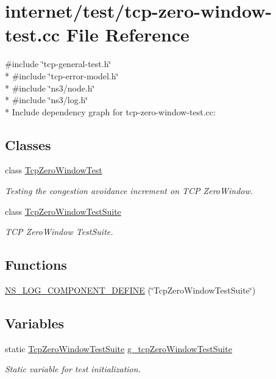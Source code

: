\hypertarget{tcp-zero-window-test_8cc}{}\section{internet/test/tcp-\/zero-\/window-\/test.cc File Reference}
\label{tcp-zero-window-test_8cc}
{\ttfamily \#include \char`\"{}tcp-\/general-\/test.\+h\char`\"{}}\\*
{\ttfamily \#include \char`\"{}tcp-\/error-\/model.\+h\char`\"{}}\\*
{\ttfamily \#include \char`\"{}ns3/node.\+h\char`\"{}}\\*
{\ttfamily \#include \char`\"{}ns3/log.\+h\char`\"{}}\\*
Include dependency graph for tcp-\/zero-\/window-\/test.cc\+:
\subsection*{Classes}
\begin{DoxyCompactItemize}
\item 
class \hyperlink{classTcpZeroWindowTest}{Tcp\+Zero\+Window\+Test}
\begin{DoxyCompactList}\small\item\em Testing the congestion avoidance increment on T\+CP Zero\+Window. \end{DoxyCompactList}\item 
class \hyperlink{classTcpZeroWindowTestSuite}{Tcp\+Zero\+Window\+Test\+Suite}
\begin{DoxyCompactList}\small\item\em T\+CP Zero\+Window Test\+Suite. \end{DoxyCompactList}\end{DoxyCompactItemize}
\subsection*{Functions}
\begin{DoxyCompactItemize}
\item 
\hyperlink{tcp-zero-window-test_8cc_afe5e72fb6bbe19122a218cfb27ef91a9}{N\+S\+\_\+\+L\+O\+G\+\_\+\+C\+O\+M\+P\+O\+N\+E\+N\+T\+\_\+\+D\+E\+F\+I\+NE} (\char`\"{}Tcp\+Zero\+Window\+Test\+Suite\char`\"{})
\end{DoxyCompactItemize}
\subsection*{Variables}
\begin{DoxyCompactItemize}
\item 
static \hyperlink{classTcpZeroWindowTestSuite}{Tcp\+Zero\+Window\+Test\+Suite} \hyperlink{tcp-zero-window-test_8cc_a3180dd018b0558bc11fc53df1b6e488d}{g\+\_\+tcp\+Zero\+Window\+Test\+Suite}
\begin{DoxyCompactList}\small\item\em Static variable for test initialization. \end{DoxyCompactList}\end{DoxyCompactItemize}


